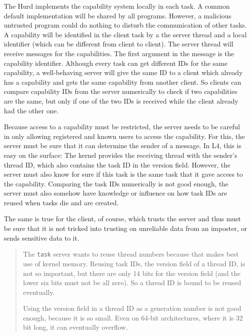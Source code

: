 \documentclass[9pt,a4paper]{extarticle}
\newenvironment{comment}{\footnotesize \begin{quote}}{\end{quote}}
\begin{document}
The Hurd implements the capability system locally in each task.  A
common default implementation will be shared by all programs.
However, a malicious untrusted program could do nothing to disturb the
communication of other tasks.  A capability will be identified in the
client task by a the server thread and a local identifier (which can
be different from client to client).  The server thread will receive
messages for the capabilities.  The first argument in the message is
the capability identifier.  Although every task can get different IDs
for the same capability, a well-behaving server will give the same ID
to a client which already has a capability and gets the same
capability from another client.  So clients can compare capability IDs
from the server numerically to check if two capabilities are the same,
but only if one of the two IDs is received while the client already
had the other one.

Because access to a capability must be restricted, the server needs to
be careful in only allowing registered and known users to access the
capability.  For this, the server must be sure that it can determine
the sender of a message.  In L4, this is easy on the surface: The
kernel provides the receiving thread with the sender's thread ID,
which also contains the task ID in the version field.  However, the
server must also know for sure if this task is the same task that it
gave access to the capability.  Comparing the task IDs numerically is
not good enough, the server must also somehow have knowledge or
influence on how task IDs are reused when tasks die and are created.

The same is true for the client, of course, which trusts the server
and thus must be sure that it is not tricked into trusting on
unreliable data from an imposter, or sends sensitive data to it.

\begin{comment}
  The \texttt{task} server wants to reuse thread numbers because that
  makes best use of kernel memory.  Reusing task IDs, the version
  field of a thread ID, is not so important, but there are only 14
  bits for the version field (and the lower six bits must not be all
  zero).  So a thread ID is bound to be reused eventually.
  
  Using the version field in a thread ID as a generation number is not
  good enough, because it is so small.  Even on 64-bit architectures,
  where it is 32 bit long, it can eventually overflow.
\end{comment}
\end{document}
